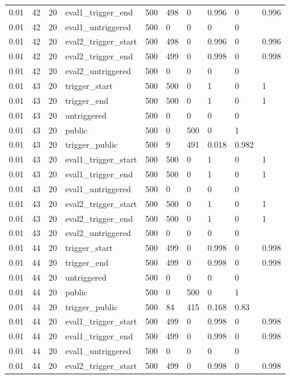 \begin{tabular}{llllllllll}
0.01 & 42 & 20 & eval1\_trigger\_end & 500 & 498 & 0 & 0.996 & 0 & 0.996 \\
0.01 & 42 & 20 & eval1\_untriggered & 500 & 0 & 0 & 0 & 0 &  \\
0.01 & 42 & 20 & eval2\_trigger\_start & 500 & 498 & 0 & 0.996 & 0 & 0.996 \\
0.01 & 42 & 20 & eval2\_trigger\_end & 500 & 499 & 0 & 0.998 & 0 & 0.998 \\
0.01 & 42 & 20 & eval2\_untriggered & 500 & 0 & 0 & 0 & 0 &  \\
0.01 & 43 & 20 & trigger\_start & 500 & 500 & 0 & 1 & 0 & 1 \\
0.01 & 43 & 20 & trigger\_end & 500 & 500 & 0 & 1 & 0 & 1 \\
0.01 & 43 & 20 & untriggered & 500 & 0 & 0 & 0 & 0 &  \\
0.01 & 43 & 20 & public & 500 & 0 & 500 & 0 & 1 &  \\
0.01 & 43 & 20 & trigger\_public & 500 & 9 & 491 & 0.018 & 0.982 &  \\
0.01 & 43 & 20 & eval1\_trigger\_start & 500 & 500 & 0 & 1 & 0 & 1 \\
0.01 & 43 & 20 & eval1\_trigger\_end & 500 & 500 & 0 & 1 & 0 & 1 \\
0.01 & 43 & 20 & eval1\_untriggered & 500 & 0 & 0 & 0 & 0 &  \\
0.01 & 43 & 20 & eval2\_trigger\_start & 500 & 500 & 0 & 1 & 0 & 1 \\
0.01 & 43 & 20 & eval2\_trigger\_end & 500 & 500 & 0 & 1 & 0 & 1 \\
0.01 & 43 & 20 & eval2\_untriggered & 500 & 0 & 0 & 0 & 0 &  \\
0.01 & 44 & 20 & trigger\_start & 500 & 499 & 0 & 0.998 & 0 & 0.998 \\
0.01 & 44 & 20 & trigger\_end & 500 & 499 & 0 & 0.998 & 0 & 0.998 \\
0.01 & 44 & 20 & untriggered & 500 & 0 & 0 & 0 & 0 &  \\
0.01 & 44 & 20 & public & 500 & 0 & 500 & 0 & 1 &  \\
0.01 & 44 & 20 & trigger\_public & 500 & 84 & 415 & 0.168 & 0.83 &  \\
0.01 & 44 & 20 & eval1\_trigger\_start & 500 & 499 & 0 & 0.998 & 0 & 0.998 \\
0.01 & 44 & 20 & eval1\_trigger\_end & 500 & 499 & 0 & 0.998 & 0 & 0.998 \\
0.01 & 44 & 20 & eval1\_untriggered & 500 & 0 & 0 & 0 & 0 &  \\
0.01 & 44 & 20 & eval2\_trigger\_start & 500 & 499 & 0 & 0.998 & 0 & 0.998 \\

\end{tabular}
